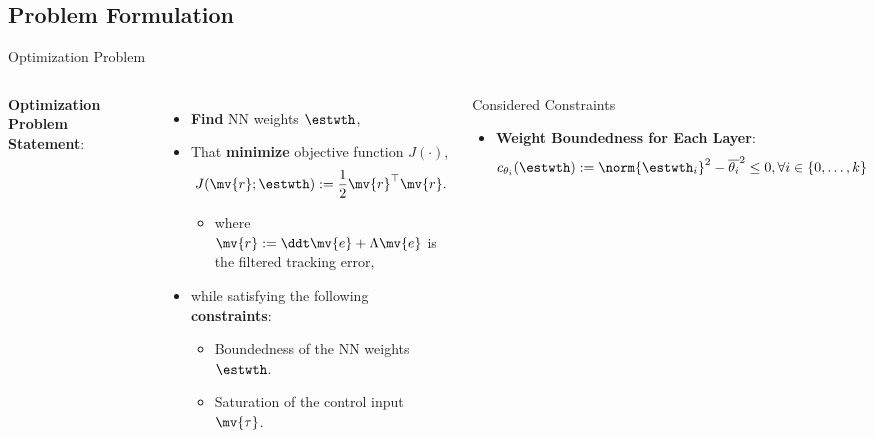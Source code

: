 \documentclass[8pt, aspectratio=169, handout]{beamer}
\begin{document}
\subsection{Problem Formulation}

\begin{frame}{\insertsubsectionhead}{Optimization Problem}

\begin{columns}


    \textbf{Optimization Problem Statement}:

    \begin{itemize}
      \item \textbf{Find} NN weights $\estwth$,
      \item That \textbf{minimize} objective function $J(\cdot)$,
        \begin{equation}\label{eq:obj}
          J(\mv{r};\estwth)
          := 
          \frac{1}{2} \mv{r}^\top \mv{r}.
        \end{equation}
        \begin{itemize}
          \item where $\mv{r} := \ddt\mv{e} + \Lambda\mv{e}$ is the filtered tracking error,
        \end{itemize}
      \item while satisfying the following \textbf{constraints}:
        \begin{itemize}
          \item Boundedness of the NN weights $\estwth$.
          \item Saturation of the control input $\mv{\tau}$.
        \end{itemize}
    \end{itemize}

  

    \begin{block}{Considered Constraints}

      \begin{itemize}
        \item \textbf{Weight Boundedness for Each Layer}: 
          \begin{equation}\label{eq:cstr:weight}
            c_{\theta_i}(\estwth)
            :=
            \norm{\estwth_i}^2 - \overline{\theta_i}^2 \le 0
            , 
            \forall i\in\{0,\ldots,k\}
          \end{equation}


\end{itemize}
\end{block}
\end{columns}
\end{frame}
\end{document}
